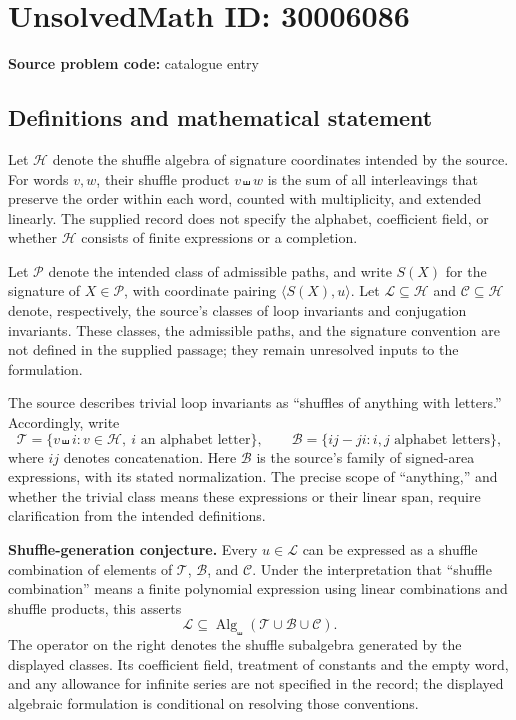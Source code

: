 \documentclass[11pt]{article}
\begin{document}
\section*{UnsolvedMath ID: 30006086}
\textbf{Source problem code:} catalogue entry
\subsection{Definitions and mathematical statement}
Let \(\mathcal H\) denote the shuffle algebra of signature coordinates intended by the source. For words \(v,w\), their shuffle product \(v\shuffle w\) is the sum of all interleavings that preserve the order within each word, counted with multiplicity, and extended linearly. The supplied record does not specify the alphabet, coefficient field, or whether \(\mathcal H\) consists of finite expressions or a completion.

Let \(\mathcal P\) denote the intended class of admissible paths, and write \(S(X)\) for the signature of \(X\in\mathcal P\), with coordinate pairing \(\langle S(X),u\rangle\). Let \(\mathcal L\subseteq\mathcal H\) and \(\mathcal C\subseteq\mathcal H\) denote, respectively, the source's classes of loop invariants and conjugation invariants. These classes, the admissible paths, and the signature convention are not defined in the supplied passage; they remain unresolved inputs to the formulation.

The source describes trivial loop invariants as ``shuffles of anything with letters.'' Accordingly, write
\[
\mathcal T=\{v\shuffle i: v\in\mathcal H,\ i\text{ an alphabet letter}\},
\qquad
\mathcal B=\{ij-ji: i,j\text{ alphabet letters}\},
\]
where \(ij\) denotes concatenation. Here \(\mathcal B\) is the source's family of signed-area expressions, with its stated normalization. The precise scope of ``anything,'' and whether the trivial class means these expressions or their linear span, require clarification from the intended definitions.

\textbf{Shuffle-generation conjecture.} Every \(u\in\mathcal L\) can be expressed as a shuffle combination of elements of \(\mathcal T\), \(\mathcal B\), and \(\mathcal C\). Under the interpretation that ``shuffle combination'' means a finite polynomial expression using linear combinations and shuffle products, this asserts
\[
\mathcal L\subseteq
\operatorname{Alg}_{\shuffle}(\mathcal T\cup\mathcal B\cup\mathcal C).
\]
The operator on the right denotes the shuffle subalgebra generated by the displayed classes. Its coefficient field, treatment of constants and the empty word, and any allowance for infinite series are not specified in the record; the displayed algebraic formulation is conditional on resolving those conventions.
\end{document}
